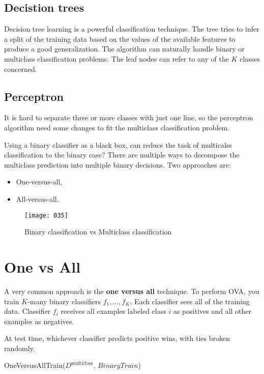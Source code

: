 \subsection{Decistion trees}
Decision tree learning is a powerful classification technique. The tree tries to infer a split of the training data based on the values of the available features to produce a good generalization. The algorithm can naturally handle binary or multiclass classification problems. The leaf nodes can refer to any of the \(K\) classes concerned.

\subsection{Perceptron}
It is hard to separate three or more classes with just one line, so the perceptron algorithm need some changes to fit the multiclass classification problem.

Using a binary classifier as a black box, can reduce the task of multicalss classification to the binary case? There are multiple ways to decompose the multiclass prediction into multiple binary decisions. Two approaches are:
\begin{itemize}
    \item One-versus-all,
    \item All-versus-all.
\end{itemize}

\begin{figure}[t]
\begin{center}
    \texttt{[image: 035]}
	\vspace*{-35pt}
\end{center}
\caption{Binary classification vs Multiclass classification}
\label{fig:035}
\end{figure}

\section{One vs All}
A very common approach is the \textbf{one versus all} technique. To perform OVA, you train \(K\)-many binary classifiers \(f_1,...,f_K\). Each classifier sees all of the training data. Classifier \(f_i\) receives all examples labeled class \(i\) as positives and all other examples as negatives.

At test time, whichever classifier predicts positive wins, with ties broken randomly.

\begin{algorithm}
    \caption{OneVersusAllTrain($D^\text{multiclass}$, $BinaryTrain$)}
    \label{alg:ovatrain}
    \end{algorithm}

